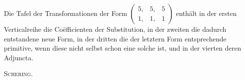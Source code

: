 Die Tafel der Transformationen der Form $\left(\begin{smallmatrix}5,&5,&5\\1,&1,&1\end{smallmatrix}\right)$ enthält in der ersten Verticalreihe die Coëfficienten der Substitution, in der zweiten die dadurch entstandene neue Form, in der dritten die der letztern Form entsprechende primitive, wenn diese nicht selbst schon eine solche ist, und in der vierten deren Adjuncta.
\begin{flushright}\textsc{Schering.}\end{flushright}

